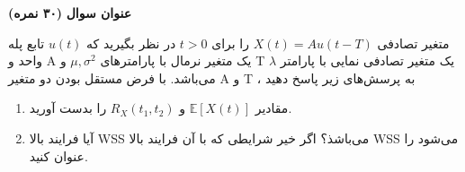 \Large \textbf{عنوان سوال}
\large \textbf{(۳۰ نمره)}

\normalsize \vspace{0.5cm}

متغیر تصادفی
$X\left( t \right) = Au\left( {t - T} \right)$
را برای
$t > 0$
در نظر بگیرید که
$u\left( t \right)$
تابع پله واحد و A یک متغیر نرمال با پارامترهای
$\mu ,{\sigma ^2}$
و T یک متغیر تصادفی نمایی با پارامتر
$\lambda$
می‌باشد. با فرض مستقل بودن دو متغیر A و T ، به پرسش‌های زیر پاسخ دهید

\begin{enumerate}[label=(\alph*)]
	\item
	مقادیر
	$\mathbb{E}\left[ {X\left( t \right)} \right]$
	و
	${R_X}\left( {{t_1},{t_2}} \right)$
	را بدست آورید.
	\item
	آیا فرایند بالا WSS می‌باشذ؟ اگر خیر شرایطی که با آن فرایند بالا WSS می‌شود را عنوان کنید.

\end{enumerate}